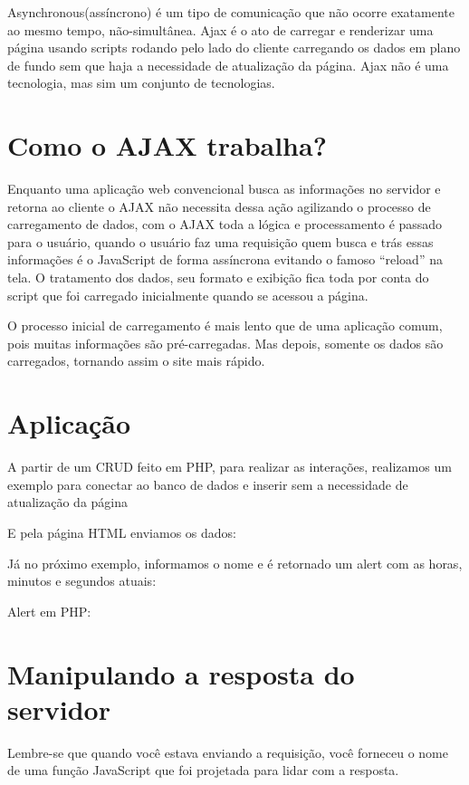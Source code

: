 \documentclass[12pt,a4paper]{article}
\begin{document}
Asynchronous(assíncrono) é um tipo de comunicação que não ocorre exatamente ao mesmo tempo, não-simultânea. Ajax é o ato de carregar e renderizar uma página usando scripts rodando pelo lado do cliente carregando os dados em plano de fundo sem que haja a necessidade de atualização da página. Ajax não é uma tecnologia, mas sim um conjunto de tecnologias.

\section{Como o AJAX trabalha?}

Enquanto uma aplicação web convencional busca as informações no servidor e retorna ao cliente o AJAX não necessita dessa ação agilizando o processo de carregamento de dados, com o AJAX  toda a lógica e processamento é passado para o usuário, quando o usuário faz uma requisição quem busca e trás essas informações é o JavaScript de forma assíncrona evitando o famoso “reload” na tela. O tratamento dos dados, seu formato e exibição fica toda por conta do script que foi carregado inicialmente quando se acessou a página.

O processo inicial de carregamento é mais lento que de uma aplicação comum, pois muitas informações são pré-carregadas. Mas depois, somente os dados são carregados, tornando assim o site mais rápido.

\section{Aplicação}
A partir de um CRUD feito em PHP, para realizar as interações, realizamos um exemplo para conectar ao banco de dados e inserir sem a necessidade de atualização da página


E pela página HTML enviamos os dados:

 
Já no próximo exemplo, informamos o nome e é retornado um alert com as horas, minutos e segundos atuais:

Alert em PHP:



\section{Manipulando a resposta do servidor}
Lembre-se que quando você estava enviando a requisição, você forneceu o nome de uma função JavaScript que foi projetada para lidar com a resposta.
\end{document}
